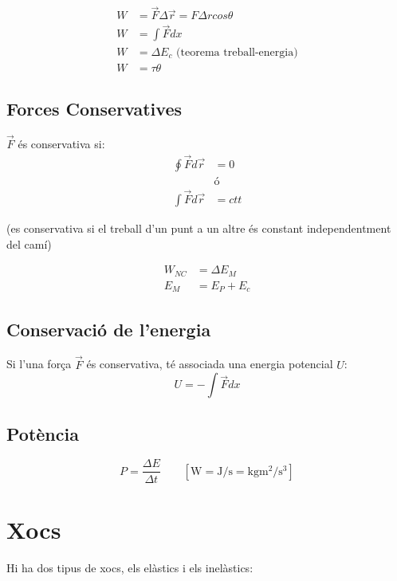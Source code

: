 \begin{align}
    W &= \vec{F}\Delta \vec{r} = F  \Delta r  cos\theta \\
    W &= \int \vec{F}dx \\
    W &= \Delta E_c \text{ (teorema treball-energia)} \\
    W &= \tau \theta
\end{align}

\subsection{Forces Conservatives}
$\vec{F}$ és conservativa si:
\begin{align*}
    \oint \vec{F}d\vec{r} &= 0 \\
    &\text{ó} \\
    \int \vec{F}d\vec{r} &= ctt
\end{align*}

\begin{center}
    (es conservativa si el treball d'un punt a un altre és constant independentment del camí)
\end{center}

\begin{align}
    W_{NC} &= \Delta E_M \\
    E_M &= E_P + E_c
\end{align}

\subsection{Conservació de l'energia}
Si l'una força $\vec{F}$ és conservativa, té associada una energia potencial $U$:
\begin{equation}
    U = - \int \vec{F} dx 
\end{equation}
\subsection{Potència}
\begin{equation}
    P = \frac{\Delta E}{\Delta t} \qquad \left[  \si{\watt} =\si{\joule\per\second} = \si{\kilo\gram\metre\squared\per\second\cubed}\right]
\end{equation}

\section{Xocs}
Hi ha dos tipus de xocs, els elàstics i els inelàstics:

